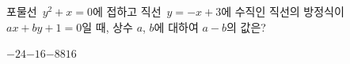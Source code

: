 포물선~$y^2+x=0$에 접하고 직선~$y=-x+3$에 수직인 직선의 방정식이 $ax+by+1=0$일 때, 상수 $a$, $b$에 대하여 $a-b$의 값은?
\begin{choices32}{$-24$}{$-16$}{$-8$}{$8$}{$16$}\end{choices32}

